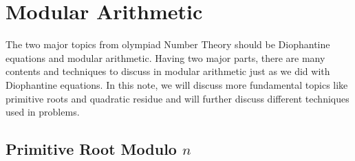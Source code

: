 \documentclass[../../main.tex]{subfiles}
\begin{document}
\chapter{Modular Arithmetic}

The two major topics from olympiad Number Theory should be
Diophantine equations and modular arithmetic. Having two major
parts, there are many contents and techniques to discuss in
modular arithmetic just as we did with Diophantine equations.
In this note, we will discuss more fundamental topics like
primitive roots and quadratic residue and will further discuss
different techniques used in problems.

\section{Primitive Root Modulo \texorpdfstring{$n$}{n}}
\end{document}
